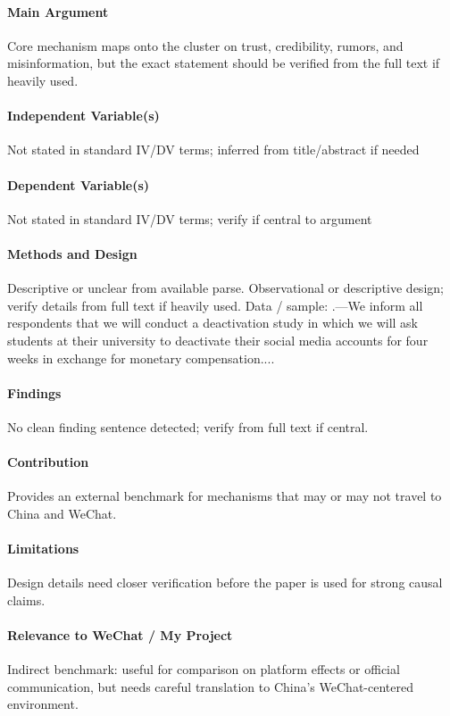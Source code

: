 \documentclass[12pt]{article}
\begin{document}
\paragraph{Main Argument} Core mechanism maps onto the cluster on trust, credibility, rumors, and misinformation, but the exact statement should be verified from the full text if heavily used.

\paragraph{Independent Variable(s)} Not stated in standard IV/DV terms; inferred from title/abstract if needed

\paragraph{Dependent Variable(s)} Not stated in standard IV/DV terms; verify if central to argument

\paragraph{Methods and Design} Descriptive or unclear from available parse. Observational or descriptive design; verify details from full text if heavily used. Data / sample: .---We inform all respondents that we will conduct a deactivation study in which we will ask students at their university to deactivate their social media accounts for four weeks in exchange for monetary compensation....

\paragraph{Findings} No clean finding sentence detected; verify from full text if central.

\paragraph{Contribution} Provides an external benchmark for mechanisms that may or may not travel to China and WeChat.

\paragraph{Limitations} Design details need closer verification before the paper is used for strong causal claims.

\paragraph{Relevance to WeChat / My Project} Indirect benchmark: useful for comparison on platform effects or official communication, but needs careful translation to China's WeChat-centered environment.
\end{document}
